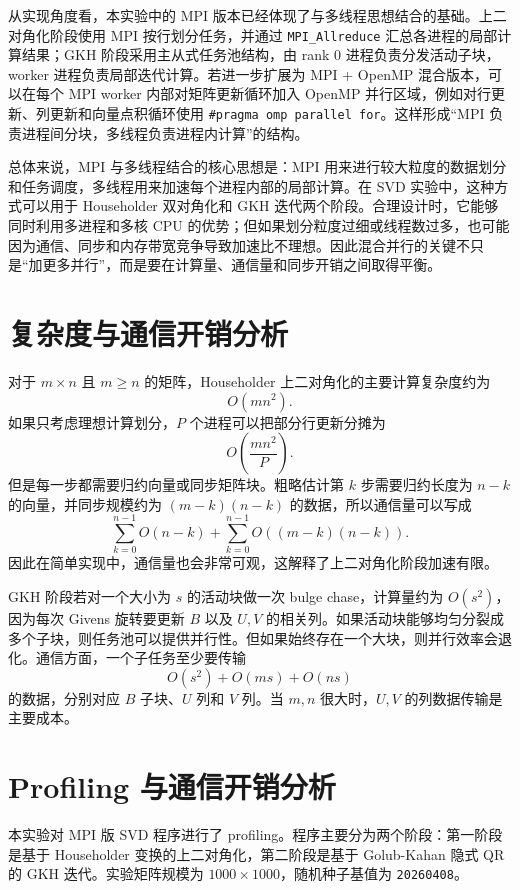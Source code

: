 \documentclass[UTF8,a4paper,12pt]{ctexart}
\begin{document}
从实现角度看，本实验中的 MPI 版本已经体现了与多线程思想结合的基础。上二对角化阶段使用 MPI 按行划分任务，并通过 \texttt{MPI\_Allreduce} 汇总各进程的局部计算结果；GKH 阶段采用主从式任务池结构，由 rank 0 进程负责分发活动子块，worker 进程负责局部迭代计算。若进一步扩展为 MPI + OpenMP 混合版本，可以在每个 MPI worker 内部对矩阵更新循环加入 OpenMP 并行区域，例如对行更新、列更新和向量点积循环使用 \texttt{\#pragma omp parallel for}。这样形成“MPI 负责进程间分块，多线程负责进程内计算”的结构。

总体来说，MPI 与多线程结合的核心思想是：MPI 用来进行较大粒度的数据划分和任务调度，多线程用来加速每个进程内部的局部计算。在 SVD 实验中，这种方式可以用于 Householder 双对角化和 GKH 迭代两个阶段。合理设计时，它能够同时利用多进程和多核 CPU 的优势；但如果划分粒度过细或线程数过多，也可能因为通信、同步和内存带宽竞争导致加速比不理想。因此混合并行的关键不只是“加更多并行”，而是要在计算量、通信量和同步开销之间取得平衡。

\section{复杂度与通信开销分析}

对于 $m\times n$ 且 $m\ge n$ 的矩阵，Householder 上二对角化的主要计算复杂度约为
\[
O(mn^2).
\]
如果只考虑理想计算划分，$P$ 个进程可以把部分行更新分摊为
\[
O\left(\frac{mn^2}{P}\right).
\]
但是每一步都需要归约向量或同步矩阵块。粗略估计第 $k$ 步需要归约长度为 $n-k$ 的向量，并同步规模约为 $(m-k)(n-k)$ 的数据，所以通信量可以写成
\[
\sum_{k=0}^{n-1} O(n-k) + \sum_{k=0}^{n-1}O((m-k)(n-k)).
\]
因此在简单实现中，通信量也会非常可观，这解释了上二对角化阶段加速有限。

GKH 阶段若对一个大小为 $s$ 的活动块做一次 bulge chase，计算量约为 $O(s^2)$，因为每次 Givens 旋转要更新 $B$ 以及 $U,V$ 的相关列。如果活动块能够均匀分裂成多个子块，则任务池可以提供并行性。但如果始终存在一个大块，则并行效率会退化。通信方面，一个子任务至少要传输
\[
O(s^2) + O(ms) + O(ns)
\]
的数据，分别对应 $B$ 子块、$U$ 列和 $V$ 列。当 $m,n$ 很大时，$U,V$ 的列数据传输是主要成本。

\section{Profiling 与通信开销分析}

本实验对 MPI 版 SVD 程序进行了 profiling。程序主要分为两个阶段：第一阶段是基于 Householder 变换的上二对角化，第二阶段是基于 Golub-Kahan 隐式 QR 的 GKH 迭代。实验矩阵规模为 $1000\times1000$，随机种子基值为 \texttt{20260408}。
\end{document}
